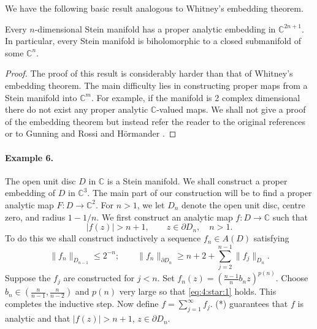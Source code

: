 We have the following basic result analogous to Whitney's embedding theorem.

 Every $n$-dimensional Stein manifold has a proper analytic embedding in $\mathbb C^{2n+1}$. In particular, every Stein manifold is biholomorphic to a closed submanifold of some $\mathbb C^n$.
\begin{proof}
The proof of this result is considerably harder than that of Whitney's embedding theorem. The main difficulty lies in constructing proper maps from a Stein manifold into $\mathbb C^m$. For example, if the manifold is 2 complex dimensional there do not exist any proper analytic $\mathbb C$-valued maps. We shall not give a proof of the embedding theorem but instead refer the reader to the original references or to Gunning and Rossi \cite{bib:I:gunning-r-c-and-rossi-h:1} and H\"ormander \cite{bib:I:hormander-l:1}.
\end{proof}

\paragraph*{Example 6.} The open unit disc $D$ in $\mathbb C$ is a Stein manifold. We shall construct a proper embedding of $D$ in $\mathbb C^3$. The main part of our construction will be to find a proper analytic map $F:D\longrightarrow\mathbb C^2$. For $n>1$, we let $D_n$ denote the open unit disc, centre zero, and radius $1-1/n$. We first construct an analytic map $f:D\longrightarrow\mathbb C$ such that
\[
|f(z)|>n+1,\qquad z\in\partial D_n,\quad n>1.
\]
To do this we shall construct inductively a sequence $f_n\in A(D)$ satisfying
\[
\|f_n\|_{D_{n-1}}\leq2^{-n};\qquad
\|f_n\|_{\partial D_n}\geq n+2+\sum_{j=2}^{n-1}\|f_j\|_{D_n}.\tag{*}\label{eq:4:star:1}
\]
Suppose the $f_j$ are constructed for $j<n$. Set $f_n(z)=\left(\frac{n-1}{n}b_nz\right)^{p(n)}$. Choose $b_n\in\left(\frac n{n-1},\frac n{n-2}\right)$ and $p(n)$ very large so that \eqref{eq:4:star:1} holds. This
completes the inductive step. Now define $f=\sum_{j=1}^\infty f_j$. (*) guarantees that $f$ is analytic and that $|f(z)|>n+1$, $z\in\partial D_n$.

